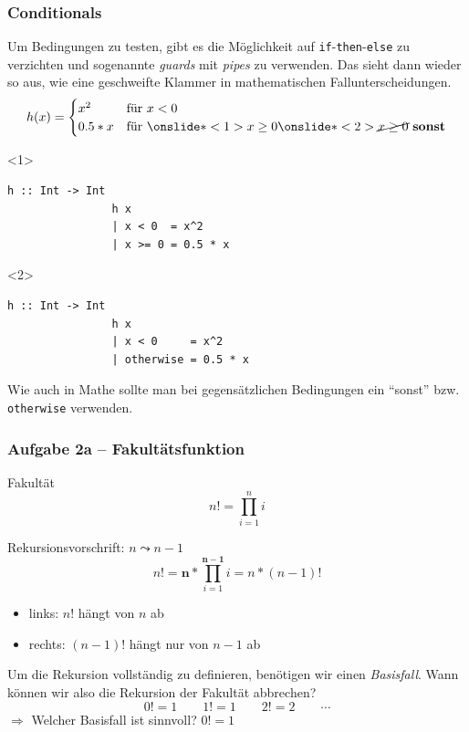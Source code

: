 \documentclass{beamer}
\begin{document}
	\begin{frame}[fragile] \frametitle{Conditionals}
		\footnotesize
		Um Bedingungen zu testen, gibt es die Möglichkeit auf \texttt{if}-\texttt{then}-\texttt{else} zu verzichten und sogenannte \textit{guards} mit \textit{pipes} zu verwenden. Das sieht dann wieder so aus, wie eine geschweifte Klammer in mathematischen Fallunterscheidungen. 
		\begin{equation*}
			h(x) = \begin{cases}
				x^2 & \text{für } x < 0 \\
				0.5*x & \text{für } \onslide*<1>{x \ge 0} \onslide*<2>{\cancel{x \ge 0} \text{ \textbf{sonst}}}
			\end{cases} 
		\end{equation*}
		\begin{onlyenv}<1>
			\begin{lstlisting}[style=bg]
				h :: Int -> Int
				h x 
				| x < 0  = x^2 
				| x >= 0 = 0.5 * x
			\end{lstlisting}
		\end{onlyenv}
		\begin{onlyenv}<2>
			\begin{lstlisting}[style=bg]
				h :: Int -> Int
				h x 
				| x < 0     = x^2 
				| otherwise = 0.5 * x
			\end{lstlisting}
		\end{onlyenv}
		\pause
		Wie auch in Mathe sollte man bei gegensätzlichen Bedingungen ein \enquote{sonst} bzw. \texttt{otherwise} verwenden.
	\end{frame}


	\begin{frame}\frametitle{Aufgabe 2a -- Fakultätsfunktion}
		\footnotesize
		Fakultät
		\begin{equation*}
			n! = \prod_{i=1}^n i
		\end{equation*}
		
		\medskip
		\pause
		
		Rekursionsvorschrift: $n \leadsto n-1$ \pause
		\begin{equation*}
			n! = \boldsymbol{n} * \prod_{i=1}^{\boldsymbol{n-1}} i= n * (n-1)!
		\end{equation*}
		\begin{itemize}
			\item links: $n!$ hängt von $n$ ab
			\item rechts: $(n-1)!$ hängt nur von $n-1$ ab
		\end{itemize}
		
		\medskip
		\pause
		
		Um die Rekursion vollständig zu definieren, benötigen wir einen \textit{Basisfall}. Wann können wir also die Rekursion der Fakultät abbrechen?
		\begin{equation*}
			0 ! = 1 \qquad 1 ! = 1 \qquad 2! = 2 \qquad \cdots
		\end{equation*}
		$\Rightarrow$ Welcher Basisfall ist sinnvoll? \qquad $0! = 1$
	\end{frame}
\end{document}
